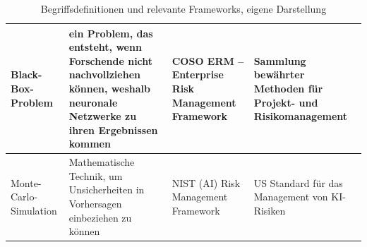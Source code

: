 \begin{center}
\begin{table}[H]
\begin{tabular}{|p{2.5cm}|p{4.9cm}|p{2.5cm}|p{4.9cm}|}
            \hline
            Black-Box-Problem & ein Problem, das entsteht, wenn Forschende nicht nachvollziehen können, weshalb neuronale Netzwerke zu ihren Ergebnissen kommen \cite{rai_explainable_2020} & COSO ERM -- Enterprise Risk Management Framework & Sammlung bewährter Methoden für Projekt- und Risikomanagement \cite{COSO_2020} \\
            \hline
            Monte-Carlo-Simulation & Mathematische Technik, um Unsicherheiten in Vorhersagen einbeziehen zu können \cite{gleisner_risikoaggregation_2019} & NIST (AI) Risk Management Framework & US Standard für das Management von KI-Risiken \cite{NIST_2023} \\
            \hline
        \end{tabular}
         \caption{Begriffsdefinitionen und relevante Frameworks, eigene Darstellung}
    \label{fig:begriffsdefinitionen}
    \end{table}
\end{center}

